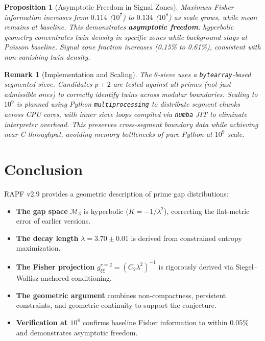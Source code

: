 \documentclass[12pt]{article}
\newtheorem{proposition}[theorem]{Proposition}
\newtheorem{remark}[theorem]{Remark}
\begin{document}
\begin{proposition}[Asymptotic Freedom in Signal Zones]
Maximum Fisher information increases from $0.114$ ($10^7$) to $0.134$ ($10^8$)
as scale grows, while mean remains at baseline. This demonstrates
\textbf{asymptotic freedom}: hyperbolic geometry concentrates twin density in
specific zones while background stays at Poisson baseline. Signal zone fraction
increases (0.15\% to 0.61\%), consistent with non-vanishing twin density.
\end{proposition}

\begin{remark}[Implementation and Scaling]
The $\theta$-sieve uses a \texttt{bytearray}-based segmented sieve. Candidates
$p+2$ are tested against \textit{all} primes (not just admissible ones) to
correctly identify twins across modular boundaries.
Scaling to $10^9$ is planned using Python \texttt{multiprocessing} to distribute
segment chunks across CPU cores, with inner sieve loops compiled via \texttt{numba}
JIT to eliminate interpreter overhead. This preserves cross-segment boundary
data while achieving near-C throughput, avoiding memory bottlenecks of pure
Python at $10^9$ scale.
\end{remark}

\section{Conclusion}

RAPF v2.9 provides a geometric description of prime gap distributions:

\begin{itemize}
  \item \textbf{The gap space} $\mathcal{M}_3$ is hyperbolic ($K = -1/\lambda^2$),
    correcting the flat-metric error of earlier versions.
  \item \textbf{The decay length} $\lambda = 3.70 \pm 0.01$ is derived from
    constrained entropy maximization.
  \item \textbf{The Fisher projection} $g_{\xi\xi}^{r=2} = (C_2\lambda^2)^{-1}$
    is rigorously derived via Siegel--Walfisz-anchored conditioning.
  \item \textbf{The geometric argument} combines non-compactness, persistent
    constraints, and geometric continuity to support the conjecture.
  \item \textbf{Verification at $10^8$} confirms baseline Fisher information
    to within $0.05\%$ and demonstrates asymptotic freedom.
\end{itemize}
\end{document}
